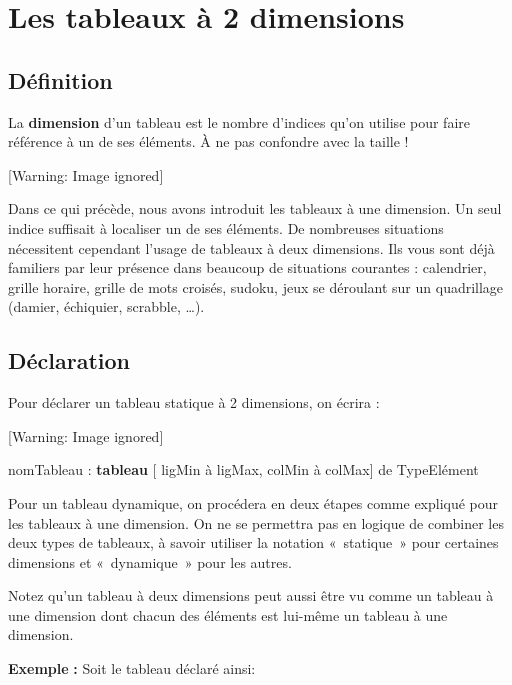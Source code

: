 \chapter[Les tableaux à 2 dimensions]{
Les tableaux à 2 dimensions}
\section{Définition}
{
La \textbf{dimension} d’un tableau est le nombre d’indices qu’on utilise
pour faire référence à un de ses éléments. À ne pas confondre avec la
taille !}

\begin{center}
 [Warning: Image ignored] %

\end{center}
{
Dans ce qui précède, nous avons introduit les tableaux à une dimension.
Un seul indice suffisait à localiser un de ses éléments. De nombreuses
situations nécessitent cependant l’usage de tableaux à deux dimensions.
Ils vous sont déjà familiers par leur présence dans beaucoup de
situations courantes : calendrier, grille horaire, grille de mots
croisés, sudoku, jeux se déroulant sur un quadrillage (damier,
échiquier, scrabble, …).}

\section{Déclaration}
{
Pour déclarer un tableau statique à 2 dimensions, on écrira :}

\begin{center}
 [Warning: Image ignored] %

\end{center}
{\sffamily
nomTableau : \textbf{tableau} [ ligMin à ligMax, colMin à colMax] de
TypeElément}

{
Pour un tableau dynamique, on procédera en deux étapes comme expliqué
pour les tableaux à une dimension. On ne se permettra pas en logique de
combiner les deux types de tableaux, à savoir utiliser la notation
«~statique~» pour certaines dimensions et «~dynamique~» pour les
autres.}

{
Notez qu'un tableau à deux dimensions peut aussi être
vu comme un tableau à une dimension dont chacun des éléments est
lui-même un tableau à une dimension.}

{
\textbf{Exemple}\textbf{ : }Soit le tableau déclaré ainsi:}

